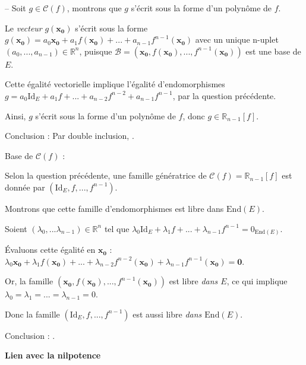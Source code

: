 \documentclass[10pt,a4paper]{article}
\begin{document}
 -- Soit \(g \in \mathcal{C}(f)\), montrons que \(g\) s'écrit sous la forme d'un polynôme de \(f\).

Le \emph{vecteur} \(g(\mathbf{x_0})\) s'écrit sous la forme \(g(\mathbf{x_0}) = a_0 \mathbf{x_0} +
a_1 f(\mathbf{x_0}) + ... + a_{n-1} f^{n-1}(\mathbf{x_0})\) avec un unique n-uplet \((a_0, ...,
a_{n-1}) \in \mathbb{R}^n\), puisque \(\mathcal{B} = (\mathbf{x_0},f(\mathbf{x_0}),...,
f^{n-1}(\mathbf{x_0}))\) est une base de \(E\).

Cette égalité vectorielle implique l'égalité d'endomorphismes \(g = a_0 \mathrm{Id}_E + a_1 f +
... + a_{n-2} f^{n-2} + a_{n-1} f^{n-1}\), par la question précédente.

Ainsi, \(g\) s'écrit sous la forme d'un polynôme de \(f\), donc \(g \in \mathbb{R}_{n-1}[f]\).

Conclusion : Par double inclusion, .

\q Base de \(\mathcal{C}(f)\) :

Selon la question précédente, une famille génératrice de \(\mathcal{C}(f) = \mathbb{R}_{n-1}[f]\)
est donnée par \((\mathrm{Id}_E, f, ..., f^{n-1})\).

Montrons que cette famille d'endomorphismes est libre dans \(\mathrm{End}(E)\).

Soient \((\lambda_0, ...\lambda_{n-1}) \in \mathbb{R}^n\) tel que \(\lambda_0\mathrm{Id}_E +
\lambda_1 f + ... + \lambda_{n-1} f^{n-1} = 0_{\mathrm{End}(E)}\).

Évaluons cette égalité en \(\mathbf{x_0}\) : \(\lambda_0\mathbf{x_0} + \lambda_1 f(\mathbf{x_0}) +
... + \lambda_{n-2} f^{n-2}(\mathbf{x_0}) + \lambda_{n-1} f^{n-1}(\mathbf{x_0}) = \mathbf{0}\).

Or, la famille \((\mathbf{x_0}, f(\mathbf{x_0}), ..., f^{n-1}(\mathbf{x_0}))\) est libre \emph{dans
\(E\)}, ce qui implique \(\lambda_0 = \lambda_1 = ... =\lambda_{n-1} = 0\).

Donc la famille \((\mathrm{Id}_E, f, ..., f^{n-1})\) est aussi libre \emph{dans
\(\mathrm{End}(E)\)}.

Conclusion : .

\bigskip
\textbf{Lien avec la nilpotence}
\end{document}
